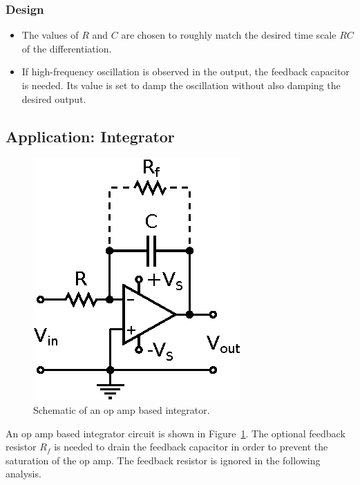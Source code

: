 \documentclass[11pt]{article}
\begin{document}
\subsubsection*{Design}
\begin{itemize}
\item The values of $R$ and $C$ are chosen to roughly match the
  desired time scale $RC$ of the differentiation.

\item If high-frequency oscillation is observed in the output, the
  feedback capacitor is needed. Its value is set to damp the
  oscillation without also damping the desired output.
  
\end{itemize}

\subsection{Application: Integrator}
\label{sec:integrator}

\begin{figure}[h!]
  \begin{center}
    \includegraphics{integrator.eps}
    \caption{Schematic of an op amp based integrator.}
    \label{fig:integrator}
  \end{center}
\end{figure}

An op amp based integrator circuit is shown in
Figure~\ref{fig:integrator}. The optional feedback resistor $R_f$ is
needed to drain the feedback capacitor in order to prevent the
saturation of the op amp. The feedback resistor is ignored in the
following analysis.
\end{document}
